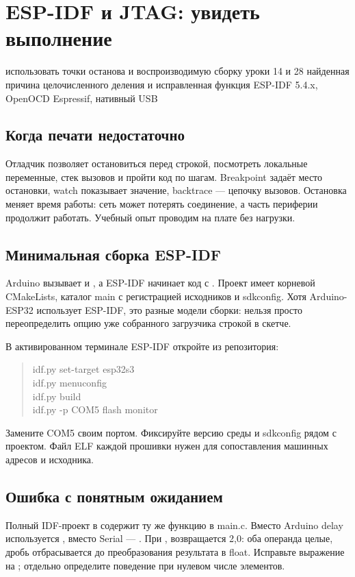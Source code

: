 \section{ESP-IDF и JTAG: увидеть выполнение}\label{les:idf-jtag}
\lessonintro
  {использовать точки останова и воспроизводимую сборку}
  {уроки 14 и 28}
  {найденная причина целочисленного деления и исправленная функция}
  {ESP-IDF 5.4.x, OpenOCD Espressif, нативный USB}

\subsection{Когда печати недостаточно}
Отладчик позволяет остановиться перед строкой, посмотреть локальные переменные,
стек вызовов и пройти код по шагам. Breakpoint задаёт место остановки, watch показывает
значение, backtrace --- цепочку вызовов. Остановка меняет время работы: сеть может потерять
соединение, а часть периферии продолжит работать. Учебный опыт проводим на плате без нагрузки.

\subsection{Минимальная сборка ESP-IDF}
Arduino вызывает  и , а ESP-IDF начинает код с .
Проект имеет корневой CMakeLists, каталог main с регистрацией исходников и sdkconfig.
Хотя Arduino-ESP32 использует ESP-IDF, это разные модели сборки: нельзя просто переопределить
опцию уже собранного загрузчика строкой в скетче.

В активированном терминале ESP-IDF откройте  из репозитория:
\begin{quote}\ttfamily\small
idf.py set-target esp32s3\\
idf.py menuconfig\\
idf.py build\\
idf.py -p COM5 flash monitor
\end{quote}
Замените COM5 своим портом. Фиксируйте версию среды и sdkconfig рядом с проектом.
Файл ELF каждой прошивки нужен для сопоставления машинных адресов и исходника.

\subsection{Ошибка с понятным ожиданием}

Полный IDF-проект в  содержит ту же функцию в main.c.
Вместо Arduino delay используется , вместо Serial --- .
При ,  возвращается 2,0: оба операнда целые, дробь отбрасывается
до преобразования результата в float. Исправьте выражение на ;
отдельно определите поведение при нулевом числе элементов.

